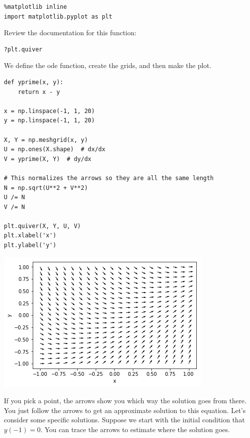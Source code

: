 \documentclass[11pt]{article}
\begin{document}
\begin{verbatim}
%matplotlib inline
import matplotlib.pyplot as plt
\end{verbatim}

Review the documentation for this function:

\begin{verbatim}
?plt.quiver
\end{verbatim}

We define the ode function, create the grids, and then make the plot.

\begin{verbatim}
def yprime(x, y):
    return x - y

x = np.linspace(-1, 1, 20)
y = np.linspace(-1, 1, 20)

X, Y = np.meshgrid(x, y)
U = np.ones(X.shape)  # dx/dx
V = yprime(X, Y)  # dy/dx

# This normalizes the arrows so they are all the same length
N = np.sqrt(U**2 + V**2)
U /= N
V /= N

plt.quiver(X, Y, U, V)
plt.xlabel('x')
plt.ylabel('y')
\end{verbatim}

\begin{center}
\includegraphics[width=.9\linewidth]{obipy-resources/05b8b46ebbc2df3b9d545d77190f5234-683117xr.png}
\end{center}

If you pick a point, the arrows show you which way the solution goes from there. You just follow the arrows to get an approximate solution to this equation. Let's consider some specific solutions. Suppose we start with the initial condition that \(y(-1) = 0\). You can trace the arrows to estimate where the solution goes.
\end{document}
